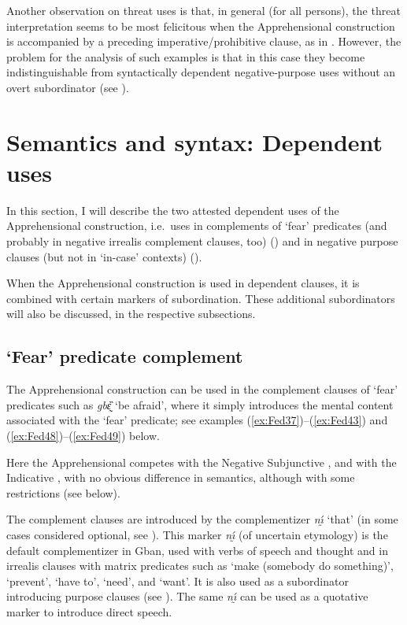 \documentclass[output=paper,colorlinks,citecolor=brown
]{langscibook}
\begin{document}
 Another observation on threat uses is that, in general (for all persons), the threat interpretation seems to be most felicitous when the Apprehensional construction is accompanied by a preceding imperative\slash prohibitive clause, as in . However, the problem for the analysis of such examples is that in this case they become indistinguishable from syntactically dependent negative-purpose uses without an overt subordinator (see ).



\section{Semantics and syntax: Dependent uses}
\label{sec:fedotov:synsemdependent}

In this section, I will describe the two attested dependent uses of the Apprehensional construction, i.e.\ uses in complements of `fear' predicates (and probably in negative irrealis complement clauses, too) () and in negative purpose clauses (but not in `in-case' contexts) ().

When the Apprehensional construction is used in dependent clauses, it is combined with certain markers of subordination. These additional subordinators will also be discussed, in the respective subsections.

\subsection{`Fear' predicate complement}
\label{subsec:fearpredicate}

The Apprehensional construction can be used in the complement clauses of `fear' predicates such as \textit{gbɛ̰̏} `be afraid', where it simply introduces the mental content associated with the `fear' predicate; see examples (\ref{ex:Fed37})--(\ref{ex:Fed43}) and (\ref{ex:Fed48})--(\ref{ex:Fed49}) below.

Here the Apprehensional competes with the Negative Subjunctive ,  and with the Indicative ,  with no obvious difference in semantics, although with some restrictions (see below).

The complement clauses are introduced by the complementizer \textit{nı̰́} `that' (in some cases considered optional, see ). This marker \textit{nı̰́} (of uncertain etymology) is the default complementizer in Gban, used with verbs of speech and thought and in irrealis clauses with matrix predicates such as `make (somebody do something)', `prevent', `have to', `need', and `want'. It is also used as a subordinator introducing purpose clauses (see ). The same \textit{nı̰́} can be used as a quotative marker to introduce direct speech.
\end{document}
